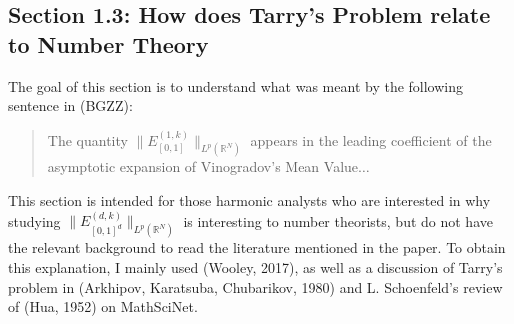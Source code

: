 \documentclass[12pt]{article}
\newcommand{\R}{\mathbb{R}}
\theoremstyle{definition}
\theoremstyle{remark}
\numberwithin{equation}{section}
\begin{document}
\subsection*{Section 1.3: How does Tarry's Problem relate to Number Theory}

The goal of this section is to understand what was meant by the following sentence in (BGZZ):
	\begin{quote}
		The quantity $\| E_{[0,1]}^{(1,k)} \|_{L^p(\R^N)}$ appears in the leading coefficient of the asymptotic expansion of Vinogradov's Mean Value$\dots$
	\end{quote}
    This section is intended for those harmonic analysts who are interested in why studying $\| E_{[0,1]^d}^{(d,k)} \|_{L^p(\R^N)}$ is interesting to number theorists, but do not have the relevant background to read the literature mentioned in the paper. To obtain this explanation, I mainly used (Wooley, 2017), as well as a discussion of Tarry's problem in (Arkhipov, Karatsuba, Chubarikov, 1980) and L. Schoenfeld's review of (Hua, 1952) on MathSciNet.
\end{document}

